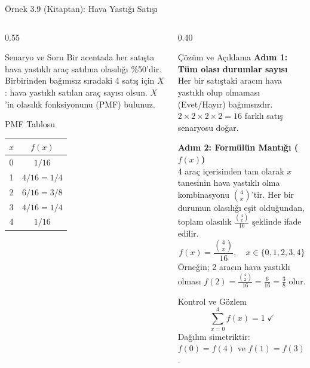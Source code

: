 ﻿\documentclass[light]{lutbeamer}
\begin{document}
\begin{frame}{Örnek 3.9 (Kitaptan): Hava Yastığı Satışı}
\footnotesize
\begin{columns}[T]
  \begin{column}{0.55\textwidth}
    \begin{block}{Senaryo ve Soru}
      Bir acentada her satışta hava yastıklı araç satılma olasılığı \%50'dir.
      Birbirinden bağımsız sıradaki 4 satış için
      $X$: hava yastıklı satılan araç sayısı olsun.
      $X$'in olasılık fonksiyonunu (PMF) bulunuz.
    \end{block}

    \begin{block}{PMF Tablosu}
      \centering
      \begin{tabular}{cc}
        \toprule
        $x$ & $f(x)$ \\
        \midrule
        0 & $1/16$ \\
        1 & $4/16 = 1/4$ \\
        2 & $6/16 = 3/8$ \\
        3 & $4/16 = 1/4$ \\
        4 & $1/16$ \\
        \bottomrule
      \end{tabular}
    \end{block}
  \end{column}
  \begin{column}{0.40\textwidth}
    \begin{alertblock}{Çözüm ve Açıklama}
      \textbf{Adım 1: Tüm olası durumlar sayısı}\\
      Her bir satıştaki aracın hava yastıklı olup olmaması (Evet/Hayır) bağımsızdır. $2 \times 2 \times 2 \times 2 = 16$ farklı satış senaryosu doğar.

      \textbf{Adım 2: Formülün Mantığı ($f(x)$)}\\
      4 araç içerisinden tam olarak $x$ tanesinin hava yastıklı olma kombinasyonu $\binom{4}{x}$'tir. Her bir durumun olasılığı eşit olduğundan, toplam olasılık $\frac{\binom{4}{x}}{16}$ şeklinde ifade edilir.
      \[
      f(x) = \frac{\binom{4}{x}}{16}, \quad x \in \{0, 1, 2, 3, 4\}
      \]
      Örneğin; 2 aracın hava yastıklı olması $f(2) = \frac{\binom{4}{2}}{16} = \frac{6}{16} = \frac{3}{8}$ olur.
    \end{alertblock}
    \begin{block}{Kontrol ve Gözlem}
      \[
      \sum_{x=0}^{4} f(x)=1 \;\checkmark
      \]
      Dağılım simetriktir: $f(0)=f(4)$ ve $f(1)=f(3)$.
    \end{block}
  \end{column}
\end{columns}
\end{frame}
\end{document}
